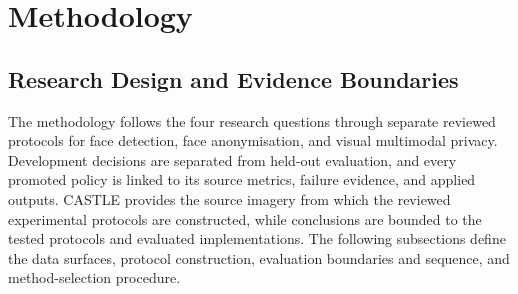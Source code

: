 \documentclass[10pt,twocolumn]{IEEEtran}
\begin{document}
\section{Methodology}
\label{sec:methodology}

\subsection{Research Design and Evidence Boundaries}

The methodology follows the four research questions through separate reviewed
protocols for face detection, face anonymisation, and visual multimodal privacy.
Development decisions are separated from held-out evaluation, and every promoted
policy is linked to its source metrics, failure evidence, and applied outputs.
CASTLE provides the source imagery from which the reviewed experimental protocols
are constructed, while conclusions are bounded to the tested protocols and
evaluated implementations. The following subsections define the data surfaces,
protocol construction, evaluation boundaries and sequence, and method-selection
procedure.
\end{document}
